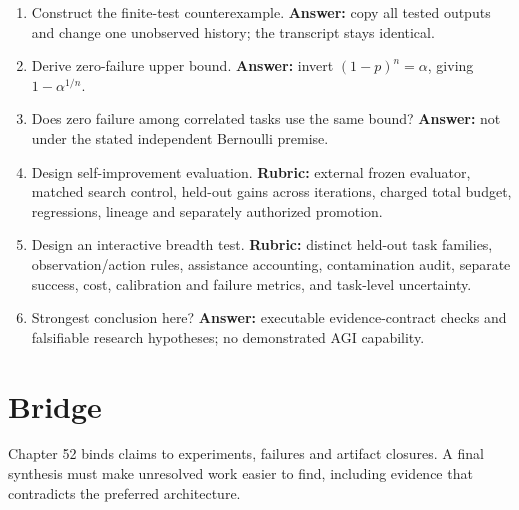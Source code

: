 \begin{enumerate}
\item Construct the finite-test counterexample. \textbf{Answer:} copy all
tested outputs and change one unobserved history; the transcript stays identical.
\item Derive zero-failure upper bound. \textbf{Answer:} invert
$(1-p)^n=\alpha$, giving $1-\alpha^{1/n}$.
\item Does zero failure among correlated tasks use the same bound? \textbf{Answer:}
not under the stated independent Bernoulli premise.
\item Design self-improvement evaluation. \textbf{Rubric:} external frozen
evaluator, matched search control, held-out gains across iterations, charged
total budget, regressions, lineage and separately authorized promotion.
\item Design an interactive breadth test. \textbf{Rubric:} distinct held-out
task families, observation/action rules, assistance accounting, contamination
audit, separate success, cost, calibration and failure metrics, and task-level uncertainty.
\item Strongest conclusion here? \textbf{Answer:} executable evidence-contract
checks and falsifiable research hypotheses; no demonstrated AGI capability.
\end{enumerate}

\section{Bridge}
Chapter 52 binds claims to experiments, failures and artifact closures. A final
synthesis must make unresolved work easier to find, including evidence that
contradicts the preferred architecture.
